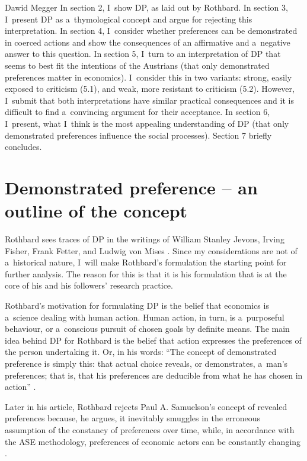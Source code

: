 \begin{artengenv}{Dawid Megger}
In section 2, I~show DP, as laid out by Rothbard. In section 3, I~present DP as a~thymological concept and argue for rejecting this interpretation. In section 4, I~consider whether preferences can be demonstrated in coerced actions and show the consequences of an affirmative and a~negative answer to this question. In section 5, I~turn to an interpretation of DP that seems to best fit the intentions of the Austrians (that only demonstrated preferences matter in economics). I~consider this in two variants: strong, easily exposed to criticism (5.1), and weak, more resistant to criticism (5.2). However, I~submit that both interpretations have similar practical consequences and it is difficult to find a~convincing argument for their acceptance. In section 6, I~present, what I~think is the most appealing understanding of DP (that only demonstrated preferences influence the social processes). Section 7 briefly concludes.



\section{Demonstrated preference -- an outline of the concept}

Rothbard sees traces of DP in the writings of William Stanley Jevons, Irving Fisher, Frank Fetter, and Ludwig von Mises 
\parencite[][p.290]{rothbard_present_2011}. %
 Since my considerations are not of a~historical nature, I~will make Rothbard's formulation the starting point for further analysis. The reason for this is that it is his formulation that is at the core of his and his followers' research practice.



Rothbard's motivation for formulating DP is the belief that economics is a~science dealing with human action. Human action, in turn, is a~purposeful behaviour, or a~conscious pursuit of chosen goals by definite means. The main idea behind DP for Rothbard is the belief that action expresses the preferences of the person undertaking it. Or, in his words: ``The concept of demonstrated preference is simply this: that actual choice reveals, or demonstrates, a~man's preferences; that is, that his preferences are deducible from what he has chosen in action'' 
\parencite[][p.290]{rothbard_present_2011}.%




Later in his article, Rothbard rejects Paul A. Samuelson's concept of revealed preferences because, he argues, it inevitably smuggles in the erroneous assumption of the constancy of preferences over time, while, in accordance with the ASE methodology, preferences of economic actors can be constantly changing 
\parencite[][p.294]{rothbard_present_2011}.%





\end{artengenv}
